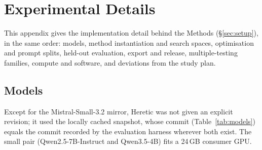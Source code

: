\section{Experimental Details}
\label{app:setup-details}

This appendix gives the implementation detail behind the Methods
(\S\ref{sec:setup}), in the same order: models, method instantiation and
search spaces, optimisation and prompt splits, held-out evaluation, export and
release, multiple-testing families, compute and software, and deviations from
the study plan.

\subsection{Models}
\label{app:setup-models}

Except for the Mistral-Small-3.2 mirror, Heretic was not given an explicit
revision; it used the locally cached snapshot, whose commit
(Table~\ref{tab:models}) equals the commit recorded by the evaluation harness
wherever both exist. The small pair (Qwen2.5-7B-Instruct and Qwen3.5-4B) fits a
24\,GB consumer GPU.

